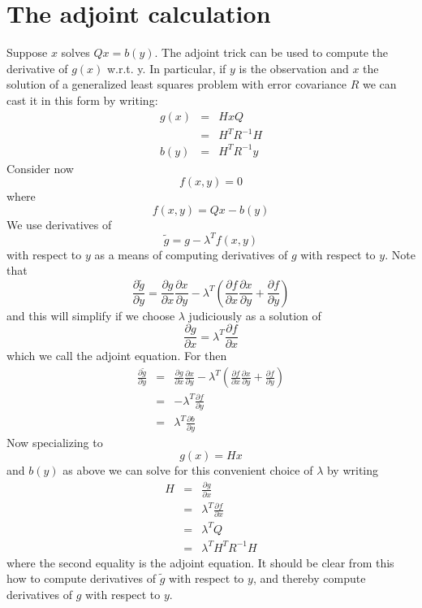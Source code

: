 \documentclass[a4paper,11pt]{article}
\begin{document}
\section{The adjoint calculation}

Suppose $x$ solves $Qx = b(y)$. The adjoint trick can be used to compute the derivative of $g(x)$ w.r.t. y. In particular, if $y$ is the observation and $x$ the solution of a generalized least squares problem with error covariance $R$ we can cast it in this form by writing: 
\begin{eqnarray} g(x)& = & H x Q \\ 
                   & = & H^T R^{-1} H \\ 
            b(y) & = & H^T R^{-1} y 
\end{eqnarray} Consider now \begin{equation} f(x,y) = 0 \end{equation} where 
\begin{equation} f(x,y) = Q x - b(y) 
\end{equation} 
We use derivatives of 
\begin{equation} \tilde{g} = g - \lambda^T f(x,y) 
\end{equation} with respect to $y$ as a means of computing derivatives of $g$ with respect to $y$. Note that \begin{equation} \frac{\partial \tilde{g}}{\partial y} = \frac{\partial g}{\partial x}\frac{\partial x}{\partial y} - \lambda^T \left( \frac{ \partial f }{\partial x }\frac{\partial x}{\partial y} + \frac{\partial f}{\partial y} \right) \end{equation} and this will simplify if we choose $\lambda$ judiciously as a solution of \begin{equation} \frac{\partial g}{\partial x } = \lambda^T \frac{\partial f}{\partial x} \end{equation} which we call the adjoint equation. For then 
\begin{eqnarray} \frac{\partial \tilde{g}}{\partial y} 
      & = & \frac{\partial g}{\partial x}\frac{\partial x}{\partial y} - \lambda^T \left( \frac{ \partial f }{\partial x }\frac{\partial x}{\partial y} + \frac{\partial f}{\partial y} \right) \\
      & = & -\lambda^T \frac{\partial f}{\partial y} \\
      & = & \lambda^T \frac{\partial b}{\partial y} \end{eqnarray}
Now specializing to \begin{equation} g(x) = H x \end{equation} and $b(y)$ as above we can solve for this convenient choice of $\lambda$ by writing 
\begin{eqnarray} H & = & \frac{\partial g}{\partial x} \\
     & = & \lambda^T \frac{\partial f}{\partial x} \\
     & = & \lambda^T Q \\ 
     & = & \lambda^T H^T R^{-1} H 
     \end{eqnarray} where the second equality is the adjoint equation. It should be clear from this how to compute derivatives of $\tilde{g}$ with respect to $y$, and thereby compute derivatives of $g$ with respect to $y$.


\end{document}
